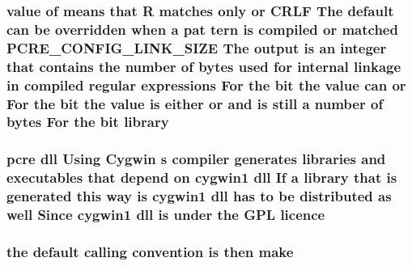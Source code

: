 \subsubsection[{\texorpdfstring{library}{library}}]{ {\bf value} {\bf of} means that {\bf R} {\bf matches} only {\bf or} {\bf C\+R\+LF} The {\bf default} {\bf can} {\bf be} overridden when {\bf a} pat tern {\bf is} {\bf compiled} {\bf or} {\bf matched} {\bf P\+C\+R\+E\+\_\+\+C\+O\+N\+F\+I\+G\+\_\+\+L\+I\+N\+K\+\_\+\+S\+I\+ZE} The {\bf output} {\bf is} an integer that {\bf contains} the {\bf number} {\bf of} {\bf bytes} {\bf used} for internal linkage {\bf in} {\bf compiled} regular {\bf expressions} For the {\bf bit} the {\bf value} {\bf can} {\bf or} For the {\bf bit} the {\bf value} {\bf is} either {\bf or} and {\bf is} {\bf still} {\bf a} {\bf number} {\bf of} {\bf bytes} For the {\bf bit} library}\hypertarget{NON-AUTOTOOLS-BUILD_8txt_a292bfbc2265d0b7ac99fc4faeb230904}{}\label{NON-AUTOTOOLS-BUILD_8txt_a292bfbc2265d0b7ac99fc4faeb230904}
\subsubsection[{\texorpdfstring{licence}{licence}}]{ {\bf pcre} dll Using Cygwin {\bf s} {\bf compiler} generates {\bf libraries} and executables that depend {\bf on} cygwin1 dll If {\bf a} {\bf library} that {\bf is} {\bf generated} {\bf this} {\bf way} {\bf is} cygwin1 dll has {\bf to} {\bf be} {\bf distributed} {\bf as} well Since cygwin1 dll {\bf is} under the {\bf G\+PL} licence}\hypertarget{NON-AUTOTOOLS-BUILD_8txt_a7834de45f43826f7bb7259394ad89754}{}\label{NON-AUTOTOOLS-BUILD_8txt_a7834de45f43826f7bb7259394ad89754}
\subsubsection[{\texorpdfstring{make}{make}}]{\setlength{\rightskip}{0pt plus 5cm}the {\bf default} calling {\bf convention} {\bf is} then make}\hypertarget{NON-AUTOTOOLS-BUILD_8txt_ad6a36213fa2f02bb4496f046f64eceae}{}\label{NON-AUTOTOOLS-BUILD_8txt_ad6a36213fa2f02bb4496f046f64eceae}

